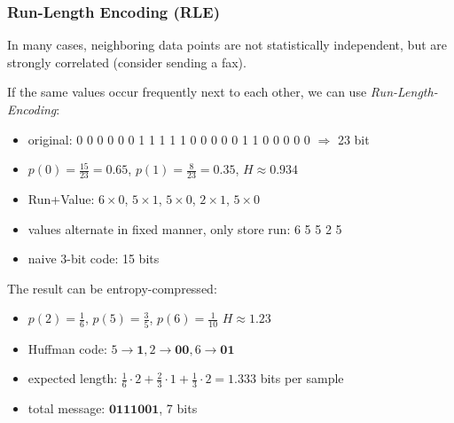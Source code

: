 \documentclass{beamer}
\begin{document}
\begin{frame}
  \frametitle{Run-Length Encoding (RLE)} In many cases, neighboring data points
  are not statistically independent, but are strongly correlated (consider
  sending a fax).

If the same values occur frequently next to each other, 
we can use \textit{Run-Length-Encoding}: 

\begin{itemize}
\item original: 0 0 0 0 0 0 1 1 1 1 1 0 0 0 0 0 1 1 0 0 0 0 0  $\Rightarrow$ 23 bit
\item $p(0)=\frac{15}{23}=0.65$, $p(1)=\frac{8}{23}=0.35$, $H\approx 0.934$
\item Run+Value: $6\times 0$, $5\times 1$, $5\times 0$, $2\times 1$, $5\times 0$
\item values alternate in fixed manner, only store run: 6 5 5 2 5
\item naive 3-bit code: 15 bits
\end{itemize}
The result can be entropy-compressed:
\begin{itemize}
\item $p(2)=\frac{1}{6}$, $p(5)=\frac{3}{5}$, $p(6)=\frac{1}{10}$ \quad $H \approx 1.23$
\item Huffman code: $5\rightarrow \mathbf{1}, 2\rightarrow\mathbf{00}, 6\rightarrow\mathbf{01}$
\item expected length: $\frac{1}{6}\cdot 2+\frac{2}{3}\cdot 1+ \frac{1}{3}\cdot 2 = 1.333$ bits per sample
\item total message: $\mathbf{0111001}$, 7 bits
\end{itemize}
\end{frame}
\end{document}
